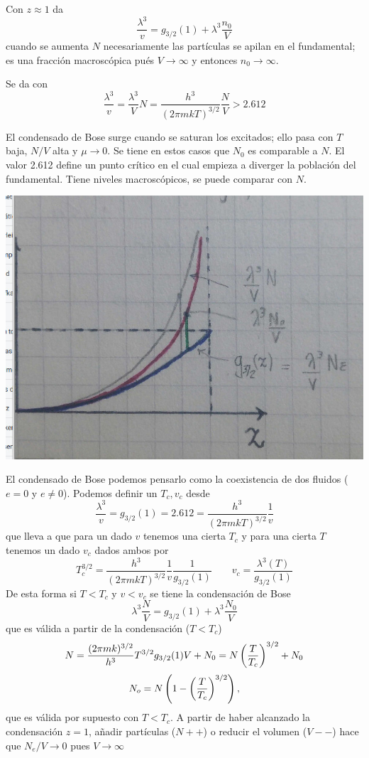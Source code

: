 \documentclass[10pt,oneside]{CBFT_book}
\begin{document}
Con $z\approx 1$ da
\[
	\frac{\lambda^3}{v} = g_{3/2}(1) + \lambda^3 \frac{n_0}{V} 
\]
cuando se aumenta $N$ necesariamente las partículas se apilan en el fundamental; es una
fracción macroscópica pués $ V \to \infty $ y entonces $ n_0 \to \infty $.

Se da con 
\[
	\frac{\lambda^3}{v} = \frac{\lambda^3}{V} N = \frac{h^3}{(2\pi m kT)^{3/2}} \frac{N}{V} > 2.612
\]

El condensado de Bose surge cuando se saturan los excitados; ello pasa con $T$ baja, $N/V$
alta y $ \mu \to 0$. Se tiene en estos casos que $N_0$ es comparable a $N$.
El valor 2.612 define un punto crítico en el cual empieza a diverger la población del fundamental.
Tiene niveles macroscópicos, se puede comparar con $N$.


\includegraphics[scale=0.5]{images/1625624568.jpg}


El condensado de Bose podemos pensarlo como la coexistencia de dos fluidos ($e=0$ y $e\neq 0$).
Podemos definir un $ T_c, v_c $ desde 
\[
	\frac{\lambda^3}{v} = g_{3/2}(1) = 2.612 = \frac{h^3}{(2 \pi m k T)^{3/2}} \frac{1}{v}
\]
que lleva a que para un dado $v$ tenemos una cierta $T_c$ y para una cierta $T$ tenemos un 
dado $v_c$ dados ambos por 
\[
	T_c^{3/2} = \frac{h^3}{(2 \pi m k T)^{3/2}} \frac{1}{v} \frac{1}{g_{3/2}(1)} \qquad 
	v_c = \frac{\lambda^3(T)}{g_{3/2}(1)}
\]
De esta forma si $ T<T_c$ y $v<v_c$ se tiene la condensación de Bose
\[
	\lambda^3\frac{N}{V} = g_{3/2}(1) + \lambda^3\frac{N_0}{V}
\]
que es válida a partir de la condensación ($T<T_c$)
\[
	N =  \frac{(2 \pi m k )^{3/2}}{h^3} T^{3/2} g_{3/2}(1)  V + N_0 = N \left( \frac{ T }{ T_c } \right)^{3/2} + N_0
\]
\[
	N_o = N \left( 1 - \left( \frac{ T }{ T_c } \right)^{3/2} \right),
\]
que es válida por supuesto con $T<T_c$.
A partir de haber alcanzado la condensación $z=1$, añadir partículas ($N++$) o reducir el volumen 
($V--$) hace que $N_e/V \to 0 $ pues $V \to \infty$
\end{document}
